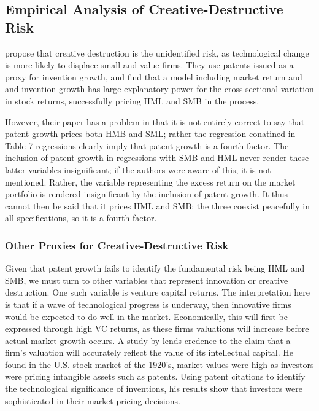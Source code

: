 \documentclass[12pt]{article}
\begin{document}
		\subsection{Empirical Analysis of Creative-Destructive Risk}
		

		\cite{grammig2010} propose that creative destruction is the unidentified risk, as technological change is more likely to displace small and value firms. They use patents issued as a proxy for invention growth, and find that a model including market return and and invention growth has large explanatory power for the cross-sectional variation in stock returns, successfully pricing HML and SMB in the process.

		However, their paper has a problem in that it is not entirely correct to say that patent growth prices both HMB and SML; rather the regression conatined in Table 7 regressions clearly imply that patent growth is a fourth factor. The inclusion of patent growth in regressions with SMB and HML never render these latter variables insignificant; if the authors were aware of this, it is not mentioned. Rather, the variable representing the excess return on the market portfolio is rendered insignificant by the inclusion of patent growth. It thus cannot then be said that it prices HML and SMB; the three coexist peacefully in all specifications, so it is a fourth factor.

		\subsubsection{Other Proxies for Creative-Destructive Risk}

		Given that patent growth fails to identify the fundamental risk being HML and SMB, we must turn to other variables that represent innovation or creative destruction. One such variable is venture capital returns. The interpretation here is that if a wave of technological progress is underway, then innovative firms would be expected to do well in the market. Economically, this will first be expressed through high VC returns, as these firms valuations will increase before actual market growth occurs. A study by \citet{nicholas2008} lends credence to the claim that a firm's valuation will accurately reflect the value of its intellectual capital. He found in the U.S. stock market of the 1920's, market values were high as investors were pricing intangible assets such as patents. Using patent citations to identify the technological significance of inventions, his results show that investors were sophisticated in their market pricing decisions. 
\end{document}
